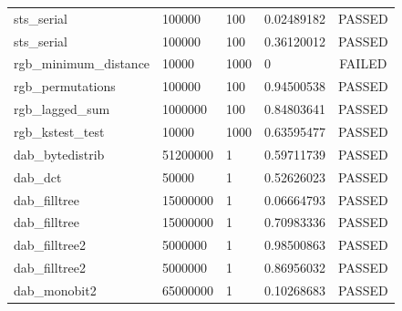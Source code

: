 \documentclass[titlepage, 11pt]{article}
\begin{document}
\begin{table}[!htb]
\begin{tabular}{l|l|l|l|c}
sts\_serial & 100000 & 100 & 0.02489182 & PASSED \\
sts\_serial & 100000 & 100 & 0.36120012 & PASSED \\
rgb\_minimum\_distance & 10000 & 1000 & 0 & FAILED \\
rgb\_permutations & 100000 & 100 & 0.94500538 & PASSED \\
rgb\_lagged\_sum & 1000000 & 100 & 0.84803641 & PASSED \\
rgb\_kstest\_test & 10000 & 1000 & 0.63595477 & PASSED \\
dab\_bytedistrib & 51200000 & 1 & 0.59711739 & PASSED \\
dab\_dct & 50000 & 1 & 0.52626023 & PASSED \\
dab\_filltree & 15000000 & 1 & 0.06664793 & PASSED \\
dab\_filltree & 15000000 & 1 & 0.70983336 & PASSED \\
dab\_filltree2 & 5000000 & 1 & 0.98500863 & PASSED \\
dab\_filltree2 & 5000000 & 1 & 0.86956032 & PASSED \\
dab\_monobit2 & 65000000 & 1 & 0.10268683 & PASSED
\end{tabular}
\end{table}


\newpage
\end{document}
